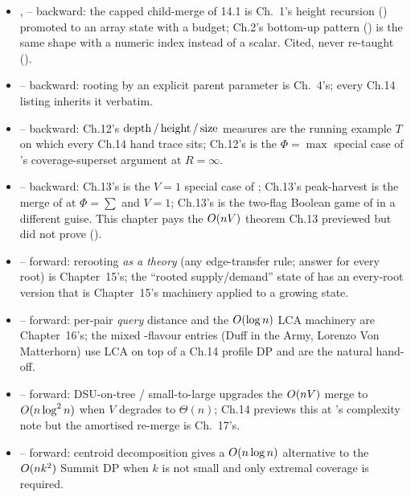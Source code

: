 \begin{itemize}[nosep, leftmargin=1.4em]
  \item {},  -- backward: the capped child-merge of
        14.1 is Ch.~1's height recursion ()
        promoted to an array state with a budget; Ch.2's bottom-up pattern
        () is the same shape with a numeric index instead of a
        scalar. Cited, never re-taught ().
  \item {} -- backward: rooting by an explicit parent parameter
        is Ch.~4's; every Ch.14 listing inherits it verbatim.
  \item {} -- backward: Ch.12's $\operatorname{depth}/\operatorname{height}/\operatorname{size}$ measures
        are the running example $T$ on which every Ch.14 hand trace sits;
        Ch.12's  is the $\Phi=\max$ special case of
        's coverage-superset argument at $R = \infty$.
  \item {} -- backward: Ch.13's  is
        the $V = 1$ special case of ; Ch.13's
         peak-harvest is the merge of 
        at $\Phi = \sum$ and $V = 1$; Ch.13's  is
        the two-flag Boolean game of  in a
        different guise. This chapter pays the $O(nV)$ theorem Ch.13
        previewed but did not prove ().
  \item {} -- forward: rerooting \emph{as a theory} (any
        edge-transfer rule; answer for every root) is Chapter~15's; the
        ``rooted supply/demand'' state of  has an
        every-root version that is Chapter~15's machinery applied to a
        growing state.
  \item {} -- forward: per-pair \emph{query} distance and the
        $O(\log n)$ LCA machinery are Chapter~16's; the mixed
        -flavour entries (Duff in the Army, Lorenzo Von
        Matterhorn) use LCA on top of a Ch.14 profile DP and are the
        natural hand-off.
  \item {} -- forward: DSU-on-tree / small-to-large upgrades
        the $O(nV)$ merge to $O(n \log^2 n)$ when $V$ degrades to
        $\Theta(n)$; Ch.14 previews this at 's
        complexity note but the amortised re-merge is Ch.~17's.
  \item {} -- forward: centroid decomposition gives a
        $O(n \log n)$ alternative to the $O(n k^2)$ Summit DP
        when $k$ is not small and only extremal coverage is required.
\end{itemize}

